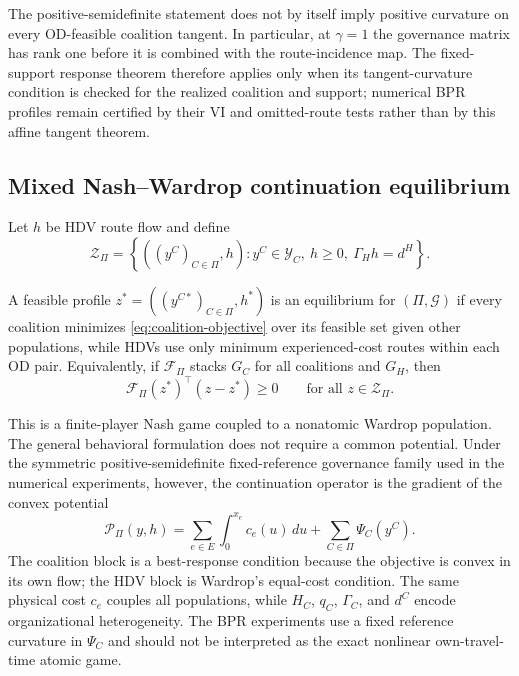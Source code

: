 The positive-semidefinite statement does not by itself imply positive curvature on every OD-feasible coalition tangent. In particular, at $\gamma=1$ the governance matrix has rank one before it is combined with the route-incidence map. The fixed-support response theorem therefore applies only when its tangent-curvature condition is checked for the realized coalition and support; numerical BPR profiles remain certified by their VI and omitted-route tests rather than by this affine tangent theorem.

\subsection{Mixed Nash--Wardrop continuation equilibrium}\label{sec:model_equilibrium}

Let $h$ be HDV route flow and define
\begin{equation}\label{eq:feasible}
 \mathcal Z_\Pi=\left\{((y^C)_{C\in\Pi},h): y^C\in\mathcal Y_C,\ h\geq0,\ \Gamma_Hh=d^H\right\}.
\end{equation}

\begin{definition}\label{def:eq}
A feasible profile $z^*=((y^{C*})_{C\in\Pi},h^*)$ is an equilibrium for $(\Pi,\mathcal G)$ if every coalition minimizes \eqref{eq:coalition-objective} over its feasible set given other populations, while HDVs use only minimum experienced-cost routes within each OD pair. Equivalently, if $\mathcal F_\Pi$ stacks $G_C$ for all coalitions and $G_H$, then
\begin{equation}\label{eq:VI}
 \mathcal F_\Pi(z^*)^\top(z-z^*)\geq0
 \qquad\text{for all }z\in\mathcal Z_\Pi.
\end{equation}
\end{definition}

This is a finite-player Nash game coupled to a nonatomic Wardrop population. The general behavioral formulation does not require a common potential. Under the symmetric positive-semidefinite fixed-reference governance family used in the numerical experiments, however, the continuation operator is the gradient of the convex potential
\begin{equation}\label{eq:potential}
 \mathcal P_\Pi(y,h)=\sum_{e\in E}\int_0^{x_e}c_e(u)\,du+\sum_{C\in\Pi}\Psi_C(y^C).
\end{equation}
The coalition block is a best-response condition because the objective is convex in its own flow; the HDV block is Wardrop's equal-cost condition. The same physical cost $c_e$ couples all populations, while $H_C$, $q_C$, $\Gamma_C$, and $d^C$ encode organizational heterogeneity. The BPR experiments use a fixed reference curvature in $\Psi_C$ and should not be interpreted as the exact nonlinear own-travel-time atomic game.

